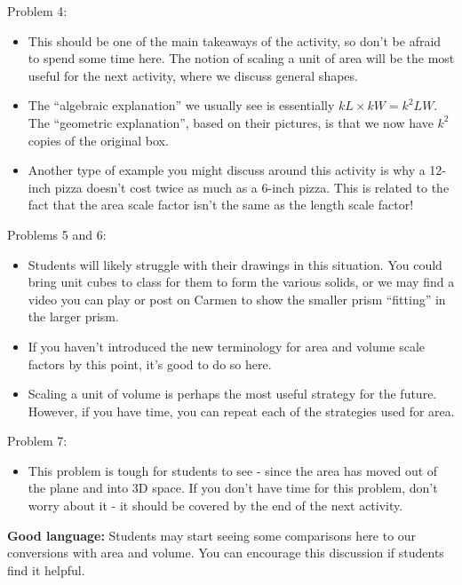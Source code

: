 \documentclass[nooutcomes,noauthor, handout]{ximera}
\begin{document}
\begin{instructorNotes}
Problem 4:
\begin{itemize}
\item This should be one of the main takeaways of the activity, so don't be afraid to spend some time here.  The notion of scaling a unit of area will be the most useful for the next activity, where we discuss general shapes.  

\item The ``algebraic explanation'' we usually see is essentially $k L \times k W = k^2 LW$.  The ``geometric explanation'', based on their pictures, is that we now have $k^2$ copies of the original box.

\item 
Another type of example you might discuss around this activity is why a 12-inch pizza doesn't cost twice as much as a 6-inch pizza. This is related to the fact that the area scale factor isn't the same as the length scale factor!
\end{itemize}


Problems 5 and 6:
\begin{itemize}
\item Students will likely struggle with their drawings in this situation.  You could bring unit cubes to class for them to form the various solids, or we may find a video you can play or post on Carmen to show the smaller prism ``fitting'' in the larger prism.  

\item If you haven't introduced the new terminology for area and volume scale factors by this point, it's good to do so here.

\item Scaling a unit of volume is perhaps the most useful strategy for the future. However, if you have time, you can repeat each of the strategies used for area.
\end{itemize}


Problem 7:
\begin{itemize}
\item This problem is tough for students to see - since the area has moved out of the plane and into 3D space.  If you don't have time for this problem, don't worry about it - it should be covered by the end of the next activity.
\end{itemize}





{\bf Good language:} Students may start seeing some comparisons here to our conversions with area and volume. You can encourage this discussion if students find it helpful. 


\end{instructorNotes}
\end{document}
